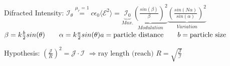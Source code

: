 \vspace{3ex} \noindent
Difracted Intensity:
\newline \vspace{2ex}
$
\mathscr{I}_{\theta}
\stackrel{\mu_{r}=1}{=}
c \epsilon_0 \langle \mathscr{E}^2 \rangle =
\underbrace{\mathscr{I}_0}_{Max.}
\underbrace{ \left( \frac{sin(\beta)}{\beta} \right)^2 }_{Modulation}
\underbrace{ \left( \frac{sin(N \alpha)}{sin(\alpha)} \right)^2 }_{Variation}
$
\vspace{2ex}
$
\newline 
\beta = k \frac{b}{2}sin(\theta)	\qquad	\alpha = k \frac{a}{2}sin(\theta) 
\newline
a = \textnormal{particle distance}	\qquad	b = \textnormal{particle size}
$


\vspace{5ex} \noindent
Hypothesis: 
$ \left( \frac{\mathscr{J}}{R}  \right)^2 = \mathscr{J} \cdot \mathscr{I} $
$
\Rightarrow \text{ray length (reach) }
R = \sqrt{ \frac{\mathscr{J}}{\mathscr{I}} }
$	
